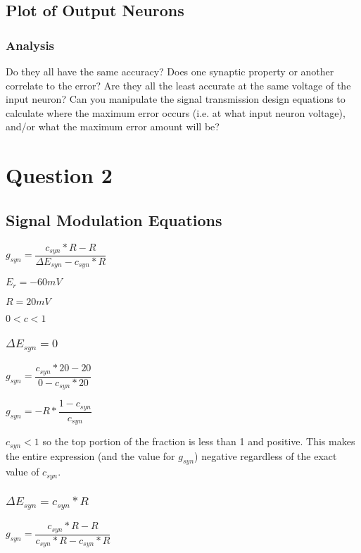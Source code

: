 \documentclass[12pt, letterpaper, oneside, notitlepage, onecolumn]{article}
\begin{document}
\subsection{Plot of Output Neurons}


\subsubsection{Analysis}

Do they all have the same accuracy? Does one synaptic property or another
correlate to the error? Are they all the least accurate at the same voltage 
of the input neuron? Can you manipulate the signal transmission design 
equations to calculate where the maximum error occurs (i.e. at what input 
neuron voltage), and/or what the maximum error amount will be?

\section{Question 2}

\subsection{Signal Modulation Equations}

$g_{syn} = \dfrac{c_{syn} * R - R}{\Delta E_{syn} - c_{syn} * R}$

$E_{r} = -60mV$

$R = 20mV$

$0 < c < 1$

\subsubsection{$\Delta E_{syn} = 0$}

$g_{syn} = \dfrac{c_{syn} * 20 - 20}{0 - c_{syn} * 20}$

$g_{syn} = -R * \dfrac{1 - c_{syn}}{c_{syn}}$

$c_{syn} < 1$ so the top portion of the fraction is less than 1 and positive.
This makes the entire expression (and the value for $g_{syn}$) negative
regardless of the exact value of $c_{syn}$.

\subsubsection{$\Delta E_{syn} = c_{syn} * R$}

$g_{syn} = \dfrac{c_{syn} * R - R}{c_{syn} * R - c_{syn} * R}$
\end{document}

